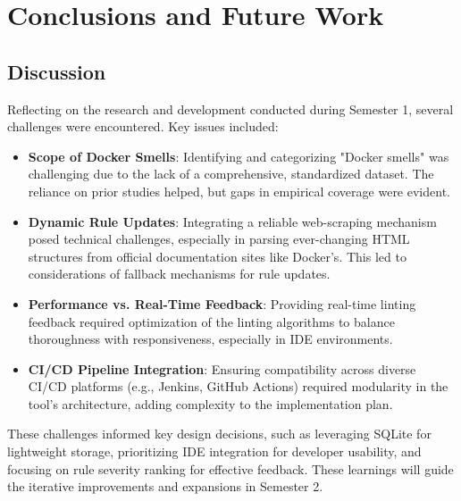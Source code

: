 \chapter{Conclusions and Future Work}
\label{chap:conclusions}

\section{Discussion}
Reflecting on the research and development conducted during Semester 1, several challenges were encountered. Key issues included:
\begin{itemize}
    \item \textbf{Scope of Docker Smells}: Identifying and categorizing "Docker smells" was challenging due to the lack of a comprehensive, standardized dataset. The reliance on prior studies helped, but gaps in empirical coverage were evident.
    \item \textbf{Dynamic Rule Updates}: Integrating a reliable web-scraping mechanism posed technical challenges, especially in parsing ever-changing HTML structures from official documentation sites like Docker's. This led to considerations of fallback mechanisms for rule updates.
    \item \textbf{Performance vs. Real-Time Feedback}: Providing real-time linting feedback required optimization of the linting algorithms to balance thoroughness with responsiveness, especially in IDE environments.
    \item \textbf{CI/CD Pipeline Integration}: Ensuring compatibility across diverse CI/CD platforms (e.g., Jenkins, GitHub Actions) required modularity in the tool's architecture, adding complexity to the implementation plan.
\end{itemize}

These challenges informed key design decisions, such as leveraging SQLite for lightweight storage, prioritizing IDE integration for developer usability, and focusing on rule severity ranking for effective feedback. These learnings will guide the iterative improvements and expansions in Semester 2.

